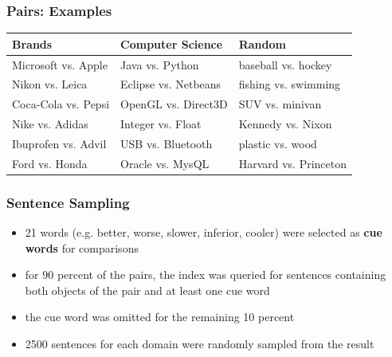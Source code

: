 \documentclass[11pt,aspectratio=169,usenames,dvipsnames]{beamer}
\begin{document}
    \begin{frame}[t]
        \frametitle{Pairs: Examples}

        \begin{tabularx}{\textwidth}{XXX}
            \toprule
            Brands & Computer Science & Random \\
            \midrule
            Microsoft vs. Apple & Java vs. Python & baseball vs. hockey \\
            Nikon vs. Leica & Eclipse vs. Netbeans & fishing vs. swimming\\
            Coca-Cola vs. Pepsi & OpenGL vs. Direct3D & SUV vs. minivan\\
            Nike vs. Adidas & Integer vs. Float & Kennedy vs. Nixon\\
            Ibuprofen vs. Advil & USB vs. Bluetooth & plastic vs. wood\\
            Ford vs. Honda & Oracle vs. MysQL & Harvard vs. Princeton\\

            \bottomrule

        \end{tabularx}

    \end{frame}

    \begin{frame}[t]
        \frametitle{Sentence Sampling}

        \begin{itemize}
            \item 21 words (e.g. better, worse, slower, inferior, cooler) were selected as \textbf{cue words} for comparisons\pause
            \item for 90 percent of the pairs, the index was queried for sentences containing both objects of the pair and at least one cue word
            \item the cue word was omitted for the remaining 10 percent\pause
            \item 2500 sentences for each domain were randomly sampled from the result
        \end{itemize}

    \end{frame}
\end{document}
